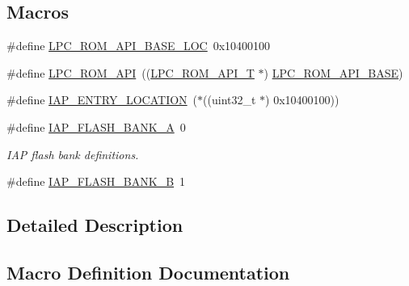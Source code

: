 \subsection*{Macros}
\begin{DoxyCompactItemize}
\item 
\#define \hyperlink{group___r_o_m_a_p_i__18_x_x__43_x_x_gafd3ca6cb0ad8c0c0b5be437a8387e51b}{L\+P\+C\+\_\+\+R\+O\+M\+\_\+\+A\+P\+I\+\_\+\+B\+A\+S\+E\+\_\+\+L\+OC}~0x10400100
\item 
\#define \hyperlink{group___r_o_m_a_p_i__18_x_x__43_x_x_ga93f07fc38c09c20a7141e175ce599ef7}{L\+P\+C\+\_\+\+R\+O\+M\+\_\+\+A\+PI}~((\hyperlink{struct_l_p_c___r_o_m___a_p_i___t}{L\+P\+C\+\_\+\+R\+O\+M\+\_\+\+A\+P\+I\+\_\+T} $\ast$) \hyperlink{group___p_e_r_i_p_h__43_x_x___b_a_s_e_ga2ae00d891b7603694f3a1eb640013f63}{L\+P\+C\+\_\+\+R\+O\+M\+\_\+\+A\+P\+I\+\_\+\+B\+A\+SE})
\item 
\#define \hyperlink{group___r_o_m_a_p_i__18_x_x__43_x_x_ga3d74da11ceb6b4ccf6d3730825406515}{I\+A\+P\+\_\+\+E\+N\+T\+R\+Y\+\_\+\+L\+O\+C\+A\+T\+I\+ON}~($\ast$((uint32\+\_\+t $\ast$) 0x10400100))
\item 
\#define \hyperlink{group___r_o_m_a_p_i__18_x_x__43_x_x_gafb9244f2e5a4884eb1bf5fb89c2b7f5b}{I\+A\+P\+\_\+\+F\+L\+A\+S\+H\+\_\+\+B\+A\+N\+K\+\_\+A}~0
\begin{DoxyCompactList}\small\item\em I\+AP flash bank definitions. \end{DoxyCompactList}\item 
\#define \hyperlink{group___r_o_m_a_p_i__18_x_x__43_x_x_ga1000a64e320d9e09ba9c671bbb380dd2}{I\+A\+P\+\_\+\+F\+L\+A\+S\+H\+\_\+\+B\+A\+N\+K\+\_\+B}~1
\end{DoxyCompactItemize}


\subsection{Detailed Description}


\subsection{Macro Definition Documentation}
\mbox{\label{group___r_o_m_a_p_i__18_x_x__43_x_x_ga3d74da11ceb6b4ccf6d3730825406515}} 
